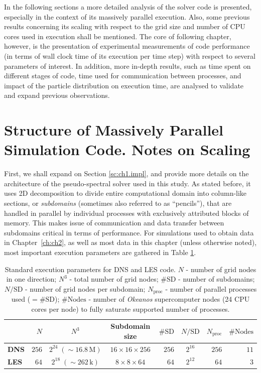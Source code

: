 \documentclass{pracamgren}
\begin{document}
In the following sections a more detailed analysis of the solver code is presented, especially in the context of its massively parallel execution.
Also, some previous results concerning its scaling with respect to the grid size and number of CPU cores used in execution shall be mentioned.
The core of following chapter, however, is the presentation of experimental measurements of code performance (in terms of wall clock time of its execution per time step) with respect to several parameters of interest.
In addition, more in-depth results, such as time spent on different stages of code, time used for communication between processes, and impact of the particle distribution on execution time, are analysed to validate and expand previous observations.


\section{Structure of Massively Parallel Simulation Code. Notes on Scaling}
\label{sc:ch3.perf}

First, we shall expand on Section \ref{sc:ch1.impl}, and provide more details on the architecture of the pseudo-spectral solver used in this study.
As stated before, it uses 2D decomposition to divide entire computational domain into column-like sections, or \emph{subdomains} (sometimes also referred to as ``pencils''), that are handled in parallel by individual processes with exclusively attributed blocks of memory.
This makes issue of communication and data transfer between subdomains critical in terms of performance.
For simulations used to obtain data in Chapter~\ref{ch:ch2}, as well as most data in this chapter (unless otherwise noted), most important execution parameters are gathered in Table \ref{tab:perfs-params}.

\begin{table}[h]
\centering
\scriptsize
\begin{tabular}{lrccrcrr}
 & $N$ & $N^3$ & Subdomain size & $\#\text{SD}$ & $N / \text{SD}$ & $N_{\text{proc}}$ & $\# \text{Nodes}$ \\ \hline
\textbf{DNS} & $256$ & $2^{24} \; (\sim 16.8 \, \text{M})$ & $16 \times 16 \times 256$ & $256$ & $2^{16}$ & $256$ & $11$ \\
\textbf{LES} & $64$ & $2^{18} \; (\sim 262 \, \text{k})$ & $8 \times 8 \times 64$ & $64$ & $2^{12}$ & $64$ & $3$ \\   
\end{tabular}
\caption{Standard execution parameters for DNS and LES code. $N$ - number of grid nodes in one direction; $N^3$ - total number of grid nodes; $\#\text{SD}$ - number of subdomains; $N / \text{SD}$ - number of grid nodes per subdomain; $N_{\text{proc}}$ - number of parallel processes used ($= \#\text{SD}$); $\# \text{Nodes}$ - number of \emph{Okeanos} supercomputer nodes (24 CPU cores per node) to fully saturate supported number of processes.
}
\label{tab:perfs-params}
\end{table}
\end{document}
